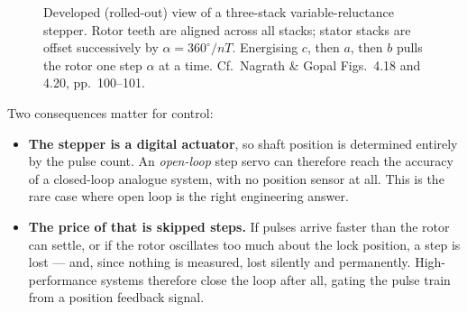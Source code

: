 \documentclass[11pt,a4paper]{article}
\begin{document}
\begin{figure}[htbp]
\centering
{}
\caption{Developed (rolled-out) view of a three-stack variable-reluctance
stepper. Rotor teeth are aligned across all stacks; stator stacks are offset
successively by $\alpha=360^\circ/nT$. Energising $c$, then $a$, then $b$ pulls
the rotor one step $\alpha$ at a time. Cf.\ Nagrath \& Gopal Figs.~4.18 and
4.20, pp.~100--101.}
\label{fig:stepper}
\end{figure}

Two consequences matter for control:

\begin{itemize}[leftmargin=*]
\item \textbf{The stepper is a digital actuator}, so shaft position is
      determined entirely by the pulse count. An \emph{open-loop} step servo
      can therefore reach the accuracy of a closed-loop analogue system, with
      no position sensor at all. This is the rare case where open loop is the
      right engineering answer.
\item \textbf{The price of that is skipped steps.} If pulses arrive faster than
      the rotor can settle, or if the rotor oscillates too much about the lock
      position, a step is lost --- and, since nothing is measured, lost
      silently and permanently. High-performance systems therefore close the
      loop after all, gating the pulse train from a position feedback signal.
\end{itemize}
\end{document}
